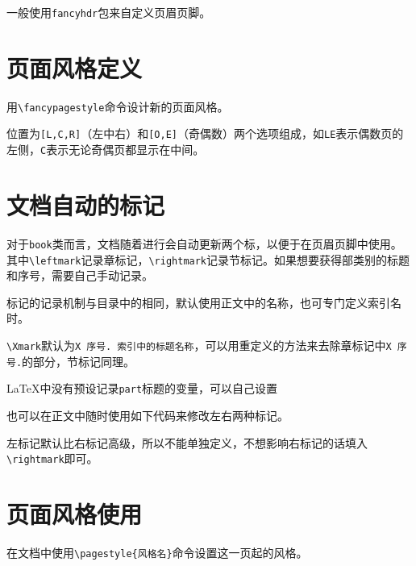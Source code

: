 \documentclass[10pt,openany]{book}
\begin{document}
\begin{sloppypar}
    一般使用\texttt{fancyhdr}包来自定义页眉页脚。

    \section{页面风格定义}

    用\texttt{\textbackslash{}fancypagestyle}命令设计新的页面风格。

    

    位置为\texttt{{[}L,C,R{]}}（左中右）和\texttt{{[}O,E{]}}（奇偶数）两个选项组成，如\texttt{LE}表示偶数页的左侧，\texttt{C}表示无论奇偶页都显示在中间。

    \section{文档自动的标记}

    对于\texttt{book}类而言，文档随着进行会自动更新两个标，以便于在页眉页脚中使用。其中\texttt{\textbackslash{}leftmark}记录章标记，\texttt{\textbackslash{}rightmark}记录节标记。如果想要获得部类别的标题和序号，需要自己手动记录。

    标记的记录机制与目录中的相同，默认使用正文中的名称，也可专门定义索引名时。

    

    \texttt{\textbackslash{}Xmark}默认为\texttt{X\ 序号.\ 索引中的标题名称}，可以用重定义的方法来去除章标记中\texttt{X\ 序号.}的部分，节标记同理。

    

    {\LaTeX}中没有预设记录\texttt{part}标题的变量，可以自己设置

    

    也可以在正文中随时使用如下代码来修改左右两种标记。

    

    左标记默认比右标记高级，所以不能单独定义，不想影响右标记的话填入\texttt{\textbackslash{}rightmark}即可。

    \section{页面风格使用}

    在文档中使用\texttt{\textbackslash{}pagestyle\{风格名\}}命令设置这一页起的风格。


\end{sloppypar}
\end{document}
